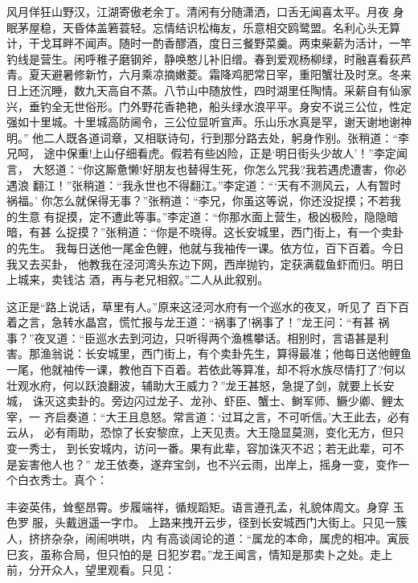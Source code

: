 风月佯狂山野汉，江湖寄傲老余丁。清闲有分随潇洒，口舌无闻喜太平。月夜
身眠茅屋稳，天昏体盖箬蓑轻。忘情结识松梅友，乐意相交鸥鹭盟。名利心头无算
计，干戈耳畔不闻声。随时一酌香醪酒，度日三餐野菜羹。两束柴薪为活计，一竿
钓线是营生。闲呼稚子磨钢斧，静唤憨儿补旧缯。春到爱观杨柳绿，时融喜看荻芦
青。夏天避暑修新竹，六月乘凉摘嫩菱。霜降鸡肥常日宰，重阳蟹壮及时烹。冬来
日上还沉睡，数九天高自不蒸。八节山中随放性，四时湖里任陶情。采薪自有仙家
兴，垂钓全无世俗形。门外野花香艳艳，船头绿水浪平平。身安不说三公位，性定
强如十里城。十里城高防阃令，三公位显听宣声。乐山乐水真是罕，谢天谢地谢神
明。”
他二人既各道词章，又相联诗句，行到那分路去处，躬身作别。张稍道：“李兄呵，
途中保重!上山仔细看虎。假若有些凶险，正是‘明日街头少故人’！”李定闻言，
大怒道：“你这厮惫懒!好朋友也替得生死，你怎么咒我?我若遇虎遭害，你必遇浪
翻江！”张稍道：“我永世也不得翻江。”李定道：“‘天有不测风云，人有暂时祸福。’
你怎么就保得无事？”张稍道：“李兄，你虽这等说，你还没捉摸；不若我的生意
有捉摸，定不遭此等事。”李定道：“你那水面上营生，极凶极险，隐隐暗暗，有甚
么捉摸？”张稍道：“你是不晓得。这长安城里，西门街上，有一个卖卦的先生。
我每日送他一尾金色鲤，他就与我袖传一课。依方位，百下百着。今日我又去买卦，
他教我在泾河湾头东边下网，西岸抛钓，定获满载鱼虾而归。明日上城来，卖钱沽
酒，再与老兄相叙。”二人从此叙别。

这正是“路上说话，草里有人。”原来这泾河水府有一个巡水的夜叉，听见了
百下百着之言，急转水晶宫，慌忙报与龙王道：“祸事了!祸事了！”龙王问：“有甚
祸事？”夜叉道：“臣巡水去到河边，只听得两个渔樵攀话。相别时，言语甚是利
害。那渔翁说：长安城里，西门街上，有个卖卦先生，算得最准；他每日送他鲤鱼
一尾，他就袖传一课，教他百下百着。若依此等算准，却不将水族尽情打了?何以
壮观水府，何以跃浪翻波，辅助大王威力？”龙王甚怒，急提了剑，就要上长安城，
诛灭这卖卦的。旁边闪过龙子、龙孙、虾臣、蟹士、鲥军师、鳜少卿、鲤太宰，一
齐启奏道：“大王且息怒。常言道：‘过耳之言，不可听信。’大王此去，必有云从，
必有雨助，恐惊了长安黎庶，上天见责。大王隐显莫测，变化无方，但只变一秀士，
到长安城内，访问一番。果有此辈，容加诛灭不迟；若无此辈，可不是妄害他人也？”
龙王依奏，遂弃宝剑，也不兴云雨，出岸上，摇身一变，变作一个白衣秀士。真个：

丰姿英伟，耸壑昂霄。步履端祥，循规蹈矩。语言遵孔孟，礼貌体周文。身穿
玉色罗服，头戴逍遥一字巾。
上路来拽开云步，径到长安城西门大街上。只见一簇人，挤挤杂杂，闹闹哄哄，内
有高谈阔论的道：“属龙的本命，属虎的相冲。寅辰巳亥，虽称合局，但只怕的是
日犯岁君。”龙王闻言，情知是那卖卜之处。走上前，分开众人，望里观看。只见：


